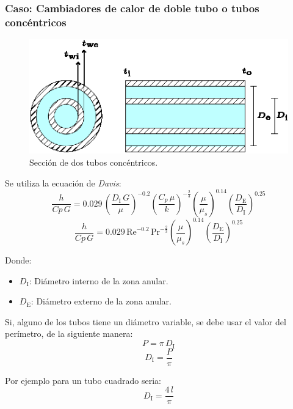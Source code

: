 \subsubsection{Caso: Cambiadores de calor de doble tubo o tubos concéntricos}
\begin{figure}[!h]
\centering
\includegraphics[scale=2.00]{figura05_03.eps}
\caption{Sección de dos tubos concéntricos.}
\end{figure}

Se utiliza la ecuación de \emph{Davis}:
\begin{equation}
    \frac{h}{Cp\,G} = 0.029\,
    \left(\frac{D_\text{I}\,G}{\mu}\right)^{-0.2}
    \left(\frac{C_p\,\mu}{k}\right)^{-\frac{2}{3}}
    \left(\frac{\mu}{\mu_s}\right)^{0.14}
    \left(\frac{D_\text{E}}{D_\text{I}}\right)^{0.25}
\end{equation}
\begin{equation*}
    \frac{h}{Cp\,G} = 0.029\,
    \text{Re}^{-0.2}\,
    \text{Pr}^{-\frac{2}{3}}
    \left(\frac{\mu}{\mu_s}\right)^{0.14}
    \left(\frac{D_\text{E}}{D_\text{I}}\right)^{0.25}
\end{equation*}

Donde:
\begin{itemize}
    \item $D_\text{I}$: Diámetro interno de la zona anular.
    \item $D_\text{E}$: Diámetro externo de la zona anular.
\end{itemize}

Si, alguno de los tubos tiene un diámetro variable, se debe usar el valor del
perímetro, de la siguiente manera:
\begin{equation*}
    P = \pi\,D_\text{I}
\end{equation*}
\begin{equation*}
    D_\text{I} = \frac{P}{\pi}
\end{equation*}

Por ejemplo para un tubo cuadrado seria:
\begin{equation*}
    D_\text{I} = \frac{4\,l}{\pi}
\end{equation*}

